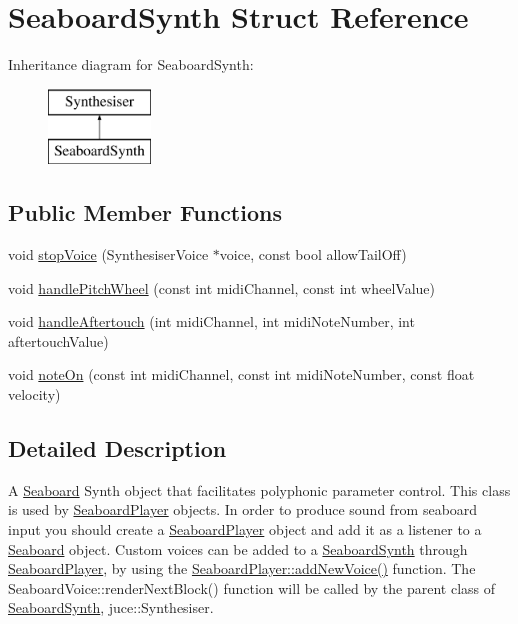 \hypertarget{struct_seaboard_synth}{\section{Seaboard\-Synth Struct Reference}
\label{struct_seaboard_synth}
}
Inheritance diagram for Seaboard\-Synth\-:\begin{figure}[H]
\begin{center}
\leavevmode
\includegraphics[height=2.000000cm]{struct_seaboard_synth}
\end{center}
\end{figure}
\subsection*{Public Member Functions}
\begin{DoxyCompactItemize}
\item 
void \hyperlink{struct_seaboard_synth_ac76b6b1e3e71db714d80c65ae28f4515}{stop\-Voice} (Synthesiser\-Voice $\ast$voice, const bool allow\-Tail\-Off)
\item 
void \hyperlink{struct_seaboard_synth_a3becf141c150948d70d7264cabb1f75d}{handle\-Pitch\-Wheel} (const int midi\-Channel, const int wheel\-Value)
\item 
void \hyperlink{struct_seaboard_synth_a0d9117ea98c40718e751116de211f16e}{handle\-Aftertouch} (int midi\-Channel, int midi\-Note\-Number, int aftertouch\-Value)
\item 
void \hyperlink{struct_seaboard_synth_a57c45f23af1233a27ab4bbdd3ff0f6be}{note\-On} (const int midi\-Channel, const int midi\-Note\-Number, const float velocity)
\end{DoxyCompactItemize}


\subsection{Detailed Description}
A \hyperlink{class_seaboard}{Seaboard} Synth object that facilitates polyphonic parameter control. This class is used by \hyperlink{class_seaboard_player}{Seaboard\-Player} objects. In order to produce sound from seaboard input you should create a \hyperlink{class_seaboard_player}{Seaboard\-Player} object and add it as a listener to a \hyperlink{class_seaboard}{Seaboard} object. Custom voices can be added to a \hyperlink{struct_seaboard_synth}{Seaboard\-Synth} through \hyperlink{class_seaboard_player}{Seaboard\-Player}, by using the \hyperlink{class_seaboard_player_a1aba40c2857902dd8791b178d6789a37}{Seaboard\-Player\-::add\-New\-Voice()} function. The Seaboard\-Voice\-::render\-Next\-Block() function will be called by the parent class of \hyperlink{struct_seaboard_synth}{Seaboard\-Synth}, juce\-::\-Synthesiser. 

